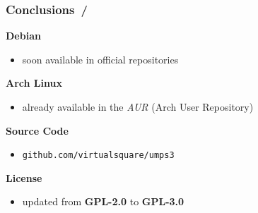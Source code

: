 \documentclass{beamer}
\begin{document}
\begin{frame}
	\frametitle{Conclusions \hspace{0pt plus 1 filll} \insertframenumber\,/\,\inserttotalframenumber}
	\begin{center}
		\begin{block}{\textbf{{\small Debian}}}
			\begin{footnotesize}
				\begin{itemize}
					\item soon available in official repositories
				\end{itemize}
			\end{footnotesize}
		\end{block}
		\begin{block}{\textbf{{\small Arch Linux}}}
			\begin{footnotesize}
				\begin{itemize}
					\item already available in the \textit{AUR} (Arch User Repository)
				\end{itemize}
			\end{footnotesize}
		\end{block}
		\begin{minipage}{0.6\textwidth}
			\begin{block}{\textbf{{\small Source Code}}}
				\begin{footnotesize}
					\begin{itemize}
						\item \texttt{github.com/virtualsquare/umps3}
					\end{itemize}
				\end{footnotesize}
			\end{block}
			\begin{block}{\textbf{{\small License}}}
				\begin{footnotesize}
					\begin{itemize}
						\item updated from \textbf{GPL-2.0} to \textbf{GPL-3.0}
					\end{itemize}
				\end{footnotesize}
			\end{block}

\end{minipage}
\end{center}
\end{frame}
\end{document}
